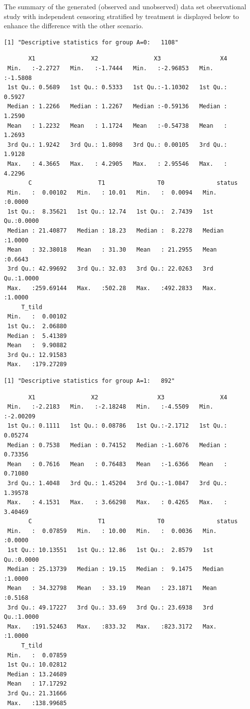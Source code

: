 \documentclass[
  11pt,
  a4paper,
]{article}
\theoremstyle{plain}
\theoremstyle{plain}
\theoremstyle{plain}
\theoremstyle{definition}
\theoremstyle{remark}
\begin{document}
The summary of the generated (observed and unobserved) data set
observational study with independent censoring stratified by treatment
is displayed below to enhance the difference with the other scenario.

\begin{verbatim}
[1] "Descriptive statistics for group A=0:   1108"
\end{verbatim}

\begin{verbatim}
       X1                X2                X3                 X4         
 Min.   :-2.2727   Min.   :-1.7444   Min.   :-2.96853   Min.   :-1.5808  
 1st Qu.: 0.5689   1st Qu.: 0.5333   1st Qu.:-1.10302   1st Qu.: 0.5927  
 Median : 1.2266   Median : 1.2267   Median :-0.59136   Median : 1.2590  
 Mean   : 1.2232   Mean   : 1.1724   Mean   :-0.54738   Mean   : 1.2693  
 3rd Qu.: 1.9242   3rd Qu.: 1.8098   3rd Qu.: 0.00105   3rd Qu.: 1.9128  
 Max.   : 4.3665   Max.   : 4.2905   Max.   : 2.95546   Max.   : 4.2296  
       C                   T1               T0               status      
 Min.   :  0.00102   Min.   : 10.01   Min.   :  0.0094   Min.   :0.0000  
 1st Qu.:  8.35621   1st Qu.: 12.74   1st Qu.:  2.7439   1st Qu.:0.0000  
 Median : 21.40877   Median : 18.23   Median :  8.2278   Median :1.0000  
 Mean   : 32.38018   Mean   : 31.30   Mean   : 21.2955   Mean   :0.6643  
 3rd Qu.: 42.99692   3rd Qu.: 32.03   3rd Qu.: 22.0263   3rd Qu.:1.0000  
 Max.   :259.69144   Max.   :502.28   Max.   :492.2833   Max.   :1.0000  
     T_tild         
 Min.   :  0.00102  
 1st Qu.:  2.06880  
 Median :  5.41389  
 Mean   :  9.90882  
 3rd Qu.: 12.91583  
 Max.   :179.27289  
\end{verbatim}

\begin{verbatim}
[1] "Descriptive statistics for group A=1:   892"
\end{verbatim}

\begin{verbatim}
       X1                X2                 X3                X4          
 Min.   :-2.2183   Min.   :-2.18248   Min.   :-4.5509   Min.   :-2.00209  
 1st Qu.: 0.1111   1st Qu.: 0.08786   1st Qu.:-2.1712   1st Qu.: 0.05274  
 Median : 0.7538   Median : 0.74152   Median :-1.6076   Median : 0.73356  
 Mean   : 0.7616   Mean   : 0.76483   Mean   :-1.6366   Mean   : 0.71080  
 3rd Qu.: 1.4048   3rd Qu.: 1.45204   3rd Qu.:-1.0847   3rd Qu.: 1.39578  
 Max.   : 4.1531   Max.   : 3.66298   Max.   : 0.4265   Max.   : 3.40469  
       C                   T1               T0               status      
 Min.   :  0.07859   Min.   : 10.00   Min.   :  0.0036   Min.   :0.0000  
 1st Qu.: 10.13551   1st Qu.: 12.86   1st Qu.:  2.8579   1st Qu.:0.0000  
 Median : 25.13739   Median : 19.15   Median :  9.1475   Median :1.0000  
 Mean   : 34.32798   Mean   : 33.19   Mean   : 23.1871   Mean   :0.5168  
 3rd Qu.: 49.17227   3rd Qu.: 33.69   3rd Qu.: 23.6938   3rd Qu.:1.0000  
 Max.   :191.52463   Max.   :833.32   Max.   :823.3172   Max.   :1.0000  
     T_tild         
 Min.   :  0.07859  
 1st Qu.: 10.02812  
 Median : 13.24689  
 Mean   : 17.17292  
 3rd Qu.: 21.31666  
 Max.   :138.99685  
\end{verbatim}
\end{document}
